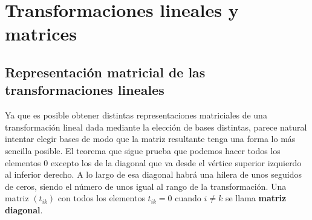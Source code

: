 \chapter{Transformaciones lineales y matrices}

\section{Representación matricial de las transformaciones lineales}

Ya que es posible obtener distintas representaciones matriciales de una transformación lineal dada mediante la elección de bases distintas, parece natural intentar elegir bases de modo que la matriz resultante tenga una forma lo más sencilla posible. El teorema que sigue prueba que podemos hacer todos los elementos $0$ excepto los de la diagonal que va desde el vértice superior izquierdo al inferior derecho. A lo largo de esa diagonal habrá una hilera de unos seguidos de ceros, siendo el número de unos igual al rango de la transformación. Una matriz $(t_{ik})$ con todos los elementos $t_{ik}=0$ cuando $i\neq k$ se llama \textbf{matriz diagonal}.

